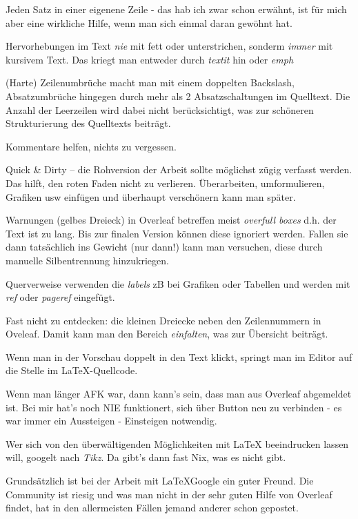 Jeden Satz in einer eigenene Zeile - das hab ich zwar schon erwähnt, ist für mich aber eine wirkliche Hilfe, wenn man sich einmal daran gewöhnt hat. 

Hervorhebungen im Text \textit{nie} mit fett oder unterstrichen, sonderm \textit{immer} mit kursivem Text. 
Das kriegt man entweder durch \textit{textit} hin oder \textit{emph}

(Harte) Zeilenumbrüche macht man mit einem doppelten Backslash, Absatzumbrüche hingegen durch mehr als 2 Absatzschaltungen im Quelltext.
Die Anzahl der Leerzeilen wird dabei nicht berücksichtigt, was zur schöneren Strukturierung des Quelltexts beiträgt. 

Kommentare helfen, nichts zu vergessen. 

Quick \& Dirty -- die Rohversion der Arbeit sollte möglichst zügig verfasst werden. 
Das hilft, den roten Faden nicht zu verlieren. 
Überarbeiten, umformulieren, Grafiken usw einfügen und überhaupt verschönern kann man später. 

Warnungen (gelbes Dreieck) in Overleaf betreffen meist \textit{overfull boxes} d.h. der Text ist zu lang. 
Bis zur finalen Version können diese ignoriert werden. 
Fallen sie dann tatsächlich ins Gewicht (nur dann!) kann man versuchen, diese durch manuelle Silbentrennung hinzukriegen. 

Querverweise verwenden die \textit{labels} zB bei Grafiken oder Tabellen und werden mit \textit{ref} oder \textit{pageref} eingefügt. 

Fast nicht zu entdecken: die kleinen Dreiecke neben den Zeilennummern in Oveleaf. 
Damit kann man den Bereich \textit{einfalten}, was zur Übersicht beiträgt.

Wenn man in der Vorschau doppelt in den Text klickt, springt man im Editor auf die Stelle im LaTeX-Quellcode. 

Wenn man länger AFK war, dann kann's sein, dass man aus Overleaf abgemeldet ist. 
Bei mir hat's noch NIE funktionert, sich über Button neu zu verbinden - es war immer ein Aussteigen - Einsteigen notwendig. 

Wer sich von den überwältigenden Möglichkeiten mit LaTeX beeindrucken lassen will, googelt nach \textit{Tikz}.
Da gibt's dann fast Nix, was es nicht gibt.

Grundsätzlich ist bei der Arbeit mit \LaTeX Google ein guter Freund. 
Die Community ist riesig und was man nicht in der sehr guten Hilfe von Overleaf findet, hat in den allermeisten Fällen jemand anderer schon gepostet. 








